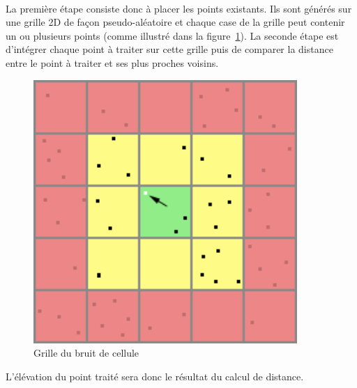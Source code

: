 \paragraph{}
La première étape consiste donc à placer les points existants. Ils sont générés sur une grille 2D de façon pseudo-aléatoire et chaque case de la grille peut contenir un ou plusieurs points (comme illustré dans la figure~\ref{fig:cell-noise}).
La seconde étape est d'intégrer chaque point à traiter sur cette grille puis de comparer la distance entre le point à traiter et ses plus proches voisins.

\begin{figure}[ht!]
    \begin{center}
        \includegraphics[width=10cm]{resources/cellgrid.png}
        \caption{Grille du bruit de cellule}
        \label{fig:cell-noise}
    \end{center}
\end{figure}

L'élévation du point traité sera donc le résultat du calcul de distance.
